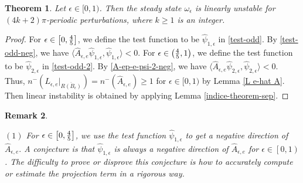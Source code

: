\documentclass[1 [leqno, 11pt]{amsart}
\numberwithin{equation}{section}
\let\ep=\epsilon
\newtheorem{Theorem}{Theorem}[section]
\newtheorem{remark}[Theorem]{Remark}
\begin{document}
\begin{CJK*}{GBK}{song}
\begin{Theorem}\label{multi-odd}
Let $\ep \in [0, 1)$. Then the steady state $\omega_\ep$ is linearly unstable for $(4k + 2)\pi$-periodic perturbations, where $k\geq1$ is an integer.
\end{Theorem}
\begin{proof}
For $\ep\in\left[0,{4\over5}\right]$, we define
 the test function to be $\hat{\psi}_{1,\ep}$   in \eqref{test-odd}.  By \eqref{test-odd-neg}, we have
$\langle\hat{A}_{\ep,e} \hat{\psi}_{1,\ep}, \hat{\psi}_{1,\ep} \rangle < 0.$
 For $\ep\in\left({4\over5},1\right)$, we define
 the test function to be $\hat{\psi}_{2,\ep}$   in \eqref{test-odd-2}.  By \eqref{A-ep-e-psi-2-neg}, we have
$\langle\hat{A}_{\ep,e} \hat{\psi}_{2,\ep}, \hat{\psi}_{2,\ep} \rangle < 0.$ Thus, $n^-\left( L_{\ep,e} |_{\overline{R(B_\ep)}} \right) = n^-\left(\hat{A}_{\ep,e}\right)\geq1$ for $\ep\in[0,1)$ by Lemma \ref{L e-hat A}. Then linear instability is obtained by applying Lemma  \ref{indice-theorem-sep}.
\end{proof}
\begin{remark}\label{number of unstable eigenvalues for multi-periodic perturbations}


$(1)$ For $\ep\in\left[0,{4\over5}\right]$, we use
 the test function $\hat{\psi}_{1,\ep}$ to get a negative direction of
$\hat{A}_{\ep,e}.$ A conjecture is that $\hat{\psi}_{1,\ep}$ is always a negative direction of
$\hat{A}_{\ep,e}$ for $\ep\in\left[0,1\right)$. The difficulty to prove or disprove this conjecture  is how to accurately compute or estimate the projection term in a rigorous way.



\end{remark}
\end{CJK*}
\end{document}
